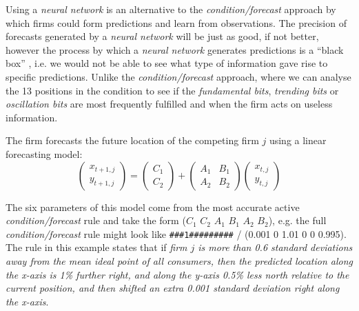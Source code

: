 \documentclass[preprint, 12pt]{elsarticle}
\begin{document}
Using a \emph{neural network} is an alternative to the \emph{condition/forecast} approach by which firms could form predictions and learn from observations. The precision of forecasts generated by a \emph{neural network} will be just as good, if not better, however the process by which a \emph{neural network} generates predictions is a ``black box'' \citep[chapter~3]{Arthur_2014}, i.e. we would not be able to see what type of information gave rise to specific predictions. Unlike the \emph{condition/forecast} approach, where we can analyse the 13 positions in the condition to see if the \emph{fundamental bits}, \emph{trending bits} or \emph{oscillation bits} are most frequently fulfilled and when the firm acts on useless information. 

The firm forecasts the future location of the competing firm $j$ using a linear forecasting model:
$$\left( \begin{array}{*{20}{c}} {{x_{t + 1,j}}}\\ {{y_{t + 1,j}}} \end{array} \right) = \left( {\begin{array}{*{20}{c}} {{C_1}}\\ {{C_2}} \end{array}} \right) + \left( {\begin{array}{*{20}{c}} {{A_1}}&{{B_1}}\\ {{A_2}}&{{B_2}} \end{array}} \right)\left( {\begin{array}{*{20}{c}} {{x_{t,j}}}\\ {{y_{t,j}}} \end{array}} \right)$$

The six parameters of this model come from the most accurate active \emph{condition/forecast} rule and take the form ($C_1$ $C_2$ $A_1$ $B_1$ $A_2$ $B_2$), e.g. the full \emph{condition/forecast} rule might look like \texttt{\#\#\#1\#\#\#\#\#\#\#\#\#} / (0.001 0 1.01 0 0 0.995). The rule in this example states that if \emph{firm $j$ is more than 0.6 standard deviations away from the mean ideal point of all consumers, then the predicted location along the x-axis is 1\% further right, and along the y-axis 0.5\% less north relative to the current position, and then shifted an extra 0.001 standard deviation right along the x-axis}.
\end{document}
